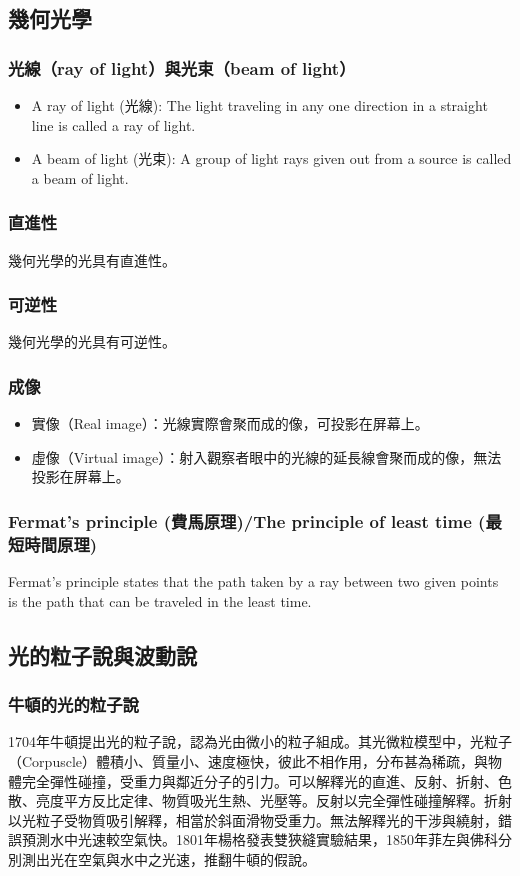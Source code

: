 \documentclass[a4paper,12pt]{report}
\begin{document}
\subsection{幾何光學}
\subsubsection{光線（ray of light）與光束（beam of light）}
\begin{itemize}
\item A ray of light (光線): The light traveling in any one direction in a straight line is called a ray of light.
\item A beam of light (光束): A group of light rays given out from a source is called a beam of light.
\end{itemize}
\subsubsection{直進性}
幾何光學的光具有直進性。
\subsubsection{可逆性}
幾何光學的光具有可逆性。
\subsubsection{成像}
\begin{itemize}
\item 實像（Real image）：光線實際會聚而成的像，可投影在屏幕上。
\item 虛像（Virtual image）：射入觀察者眼中的光線的延長線會聚而成的像，無法投影在屏幕上。
\end{itemize}
\subsubsection{Fermat's principle (費馬原理)/The principle of least time (最短時間原理)}
Fermat's principle states that the path taken by a ray between two given points is the path that can be traveled in the least time.
\subsection{光的粒子說與波動說}
\subsubsection{牛頓的光的粒子說}
1704年牛頓提出光的粒子說，認為光由微小的粒子組成。其光微粒模型中，光粒子（Corpuscle）體積小、質量小、速度極快，彼此不相作用，分布甚為稀疏，與物體完全彈性碰撞，受重力與鄰近分子的引力。可以解釋光的直進、反射、折射、色散、亮度平方反比定律、物質吸光生熱、光壓等。反射以完全彈性碰撞解釋。折射以光粒子受物質吸引解釋，相當於斜面滑物受重力。無法解釋光的干涉與繞射，錯誤預測水中光速較空氣快。1801年楊格發表雙狹縫實驗結果，1850年菲左與佛科分別測出光在空氣與水中之光速，推翻牛頓的假說。
\end{document}
